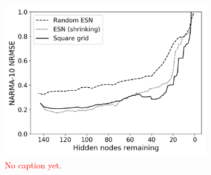 \begin{figure}
  \centering
  \includegraphics[width=3.5in]{figures/shrink-performance.png}
  \caption{
    \textcolor{red}{
      No caption yet.
    }
  }
  \label{fig:sq-shrink-performance}
\end{figure}

